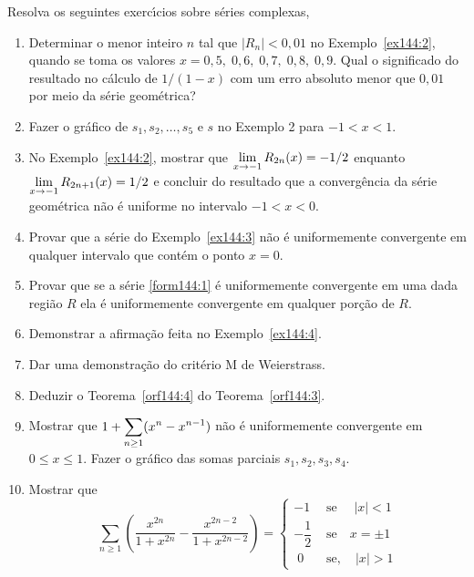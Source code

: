 Resolva os seguintes exerc\'{\i}cios sobre s\'{e}ries complexas,
\begin{enumerate}[label=\rm{(\arabic*)}]
\item Determinar o menor inteiro $n$ tal que $|R_n| < 0,01$ no
Exemplo~\ref{ex144:2}, quando se toma os valores $x=0,5,\; 0,6,\;
0,7,\; 0,8,\; 0,9$. Qual o significado do resultado no c\'{a}lculo de
$1/(1 - x)$ com um erro absoluto menor que $0,01$ por meio da
s\'{e}rie geom\'{e}trica?
\item Fazer o gr\'{a}fico de $s_1, s_2,\ldots, s_5$ e $s$ no Exemplo 2
para $- 1 < x < 1$.
\item No Exemplo~\ref{ex144:2}, mostrar que $\displaystyle{\lim_{x\to-1}
R_{2n}(x)=-1/2}$ enquanto $\displaystyle{\lim_{x\to -1} R_{2n+1}(x)=1/2}$ e
concluir do resultado que a converg\^{e}ncia da s\'{e}rie geom\'{e}trica n\~{a}o \'{e}
uniforme no intervalo $-1 < x < 0$.
\item Provar que a s\'{e}rie do Exemplo~\ref{ex144:3} n\~{a}o \'{e} uniformemente
convergente em qualquer intervalo que cont\'{e}m o ponto $x = 0$.
\item Provar que se a s\'{e}rie \eqref{form144:1} \'{e} uniformemente convergente em uma
dada regi\~{a}o $R$ ela \'{e} uniformemente convergente em qualquer por\c{c}\~{a}o
de $R$.
\item Demonstrar a afirma\c{c}\~{a}o feita no Exemplo~\ref{ex144:4}.
\item Dar uma demonstra\c{c}\~{a}o do crit\'{e}rio M de Weierstrass.
\item Deduzir o Teorema~\ref{orf144:4} do Teorema~\ref{orf144:3}.
\item Mostrar que $\displaystyle{1 + \sum_{n\geq 1}(x^n - x^{n-1})}$ n\~{a}o \'{e} uniformemente convergente
em $0 \le x \le 1$. Fazer o gr\'{a}fico das somas parciais $s_1, s_2,
s_3, s_4$.
\item Mostrar que
\begin{equation*}
\sum_{n\geq
1}\left(\frac{x^{2n}}{1+x^{2n}}-\frac{x^{2n-2}}{1+x^{2n-2}}
\right)=
  \begin{cases}
    -1 & \text{ se } \quad |x|<1 \\[2ex]
    -\dfrac{1}{2} & \text{ se}  \quad x=\pm 1\\[2ex]
    \; 0&\text{ se}, \quad |x|>1
  \end{cases}
\end{equation*}


\end{enumerate}
